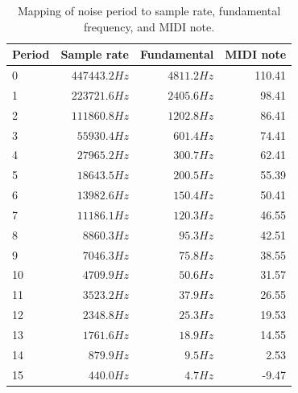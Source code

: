 \documentclass[12pt,letter]{article}
\begin{document}
\begin{table}[!htp]
\centering
\caption{Mapping of noise period to sample rate, fundamental frequency, and MIDI note.}
\label{tab:noise-periods}
\begin{tabular}{|l||r|r|r|}
\hline
 Period  & Sample rate   & Fundamental   & MIDI note \\
\hline\hline
 0       & $447443.2 Hz$ & $4811.2 Hz$   & 110.41    \\
 1       & $223721.6 Hz$ & $2405.6 Hz$   & 98.41     \\
 2       & $111860.8 Hz$ & $1202.8 Hz$   & 86.41     \\
 3       & $55930.4 Hz$  & $601.4 Hz$    & 74.41     \\
 4       & $27965.2 Hz$  & $300.7 Hz$    & 62.41     \\
 5       & $18643.5 Hz$  & $200.5 Hz$    & 55.39     \\
 6       & $13982.6 Hz$  & $150.4 Hz$    & 50.41     \\
 7       & $11186.1 Hz$  & $120.3 Hz$    & 46.55     \\
 8       & $8860.3 Hz$   & $95.3 Hz$     & 42.51     \\
 9       & $7046.3 Hz$   & $75.8 Hz$     & 38.55     \\
 10      & $4709.9 Hz$   & $50.6 Hz$     & 31.57     \\
 11      & $3523.2 Hz$   & $37.9 Hz$     & 26.55     \\
 12      & $2348.8 Hz$   & $25.3 Hz$     & 19.53     \\
 13      & $1761.6 Hz$   & $18.9 Hz$     & 14.55     \\
 14      & $879.9 Hz$    & $9.5 Hz$      & 2.53      \\
 15      & $440.0 Hz$    & $4.7 Hz$      & -9.47     \\
\hline
\end{tabular}
\end{table}


\clearpage
\renewcommand\refname{References \& Acknowledgments}
\nocite{*}


\end{document}
